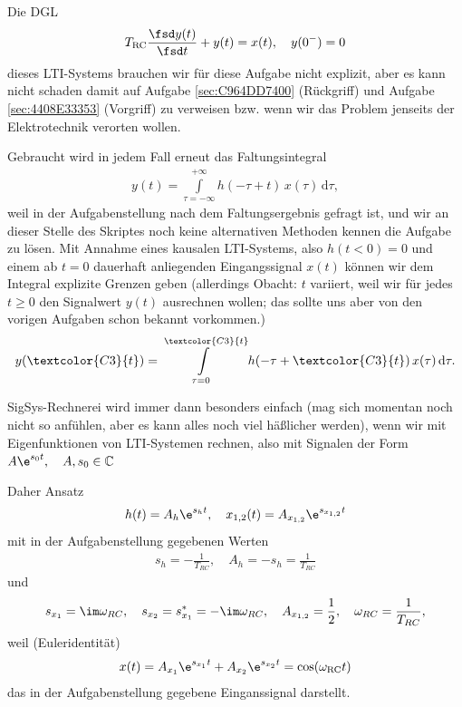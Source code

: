 \begin{Werkzeug}
Die DGL
\begin{equation}
T_\mathrm{RC} \frac{\fsd y(t)}{\fsd t} + y(t) = x(t),\quad y(0^-)=0
\end{equation}
dieses LTI-Systems brauchen wir für diese Aufgabe nicht explizit, aber es kann nicht
schaden damit auf Aufgabe \ref{sec:C964DD7400} (Rückgriff)
und Aufgabe \ref{sec:4408E33353} (Vorgriff) zu verweisen bzw. wenn wir das Problem
jenseits der Elektrotechnik verorten wollen.

Gebraucht wird in jedem Fall erneut das Faltungsintegral
\begin{align}
y(t) = \int\limits_{\tau=-\infty}^{+\infty} h(-\tau+t) \, x(\tau) \, \mathrm{d}\tau,
\end{align}
weil in der Aufgabenstellung nach dem Faltungsergebnis gefragt ist, und wir an
dieser Stelle des Skriptes noch keine alternativen Methoden kennen die Aufgabe
zu lösen.
%
Mit Annahme eines kausalen LTI-Systems, also $h(t<0) = 0$ und einem ab $t=0$ dauerhaft
anliegenden Eingangssignal $x(t)$ können wir dem Integral explizite Grenzen geben
(allerdings Obacht: $t$ variiert, weil wir für jedes $t\geq 0$ den Signalwert $y(t)$
ausrechnen wollen; das sollte uns aber von den vorigen Aufgaben schon bekannt vorkommen.)
%
\begin{align}
y(\textcolor{C3}{t}) = \int\limits_{\tau=0}^{\textcolor{C3}{t}} h(-\tau+\textcolor{C3}{t}) \, x(\tau) \, \mathrm{d}\tau.
\end{align}
\end{Werkzeug}
\begin{Ansatz}
SigSys-Rechnerei wird immer dann besonders einfach (mag sich momentan noch nicht so anfühlen,
aber es kann alles noch viel häßlicher werden), wenn wir mit Eigenfunktionen von LTI-Systemen
rechnen, also mit Signalen der Form $A \e^{s_0 t},\quad A, s_0 \in \mathbb{C}$

\noindent Daher Ansatz
\begin{align}
h(t) = A_h \e^{s_h t}, \quad x_{1,2}(t) = A_{x_{1,2}} \e^{s_{x_{1,2}} t}
\end{align}
mit in der Aufgabenstellung gegebenen Werten
\begin{align}
s_h = -\frac{1}{T_{RC}},\quad A_h = -s_h = \frac{1}{T_{RC}}
\end{align}
und
\begin{align}
s_{x_1} = \im\omega_{RC},\quad s_{x_2} = s^*_{x_1} = -\im\omega_{RC}, \quad A_{x_{1,2}}=\frac{1}{2},\quad \omega_{RC} = \frac{1}{T_{RC}},
\end{align}
weil (Euleridentität)
\begin{align}
x(t) = A_{x_{1}} \e^{s_{x_{1}} t} + A_{x_{2}} \e^{s_{x_{2}} t} = \cos(\omega_\mathrm{RC} t)
\end{align}
das in der Aufgabenstellung gegebene Einganssignal darstellt.
\end{Ansatz}
